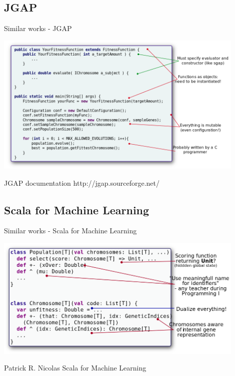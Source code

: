 \documentclass{beamer}
\begin{document}
\subsection{JGAP}
\begin{frame}{Similar works - JGAP}
  \begin{center}
    \includegraphics[width=0.9\textwidth]{images/jgap}
  \end{center}
  \footnotesize{
    \begin{thebibliography}{99}
       JGAP documentation
      \newblock http://jgap.sourceforge.net/
    \end{thebibliography}
  }
\end{frame}


\subsection{Scala for Machine Learning}
\begin{frame}{Similar works - Scala for Machine Learning}
 \begin{center}
    \includegraphics[width=0.9\textwidth]{images/sfml}
  \end{center}
  \footnotesize{
    \begin{thebibliography}{99}
       Patrick R. Nicolas
      \newblock Scala for Machine Learning
    \end{thebibliography}
  }
\end{frame}
\end{document}
